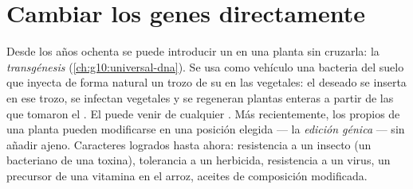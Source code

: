 \section{Cambiar los genes directamente}

\begin{proposition}\label{prop:g12:domesticated-plants:transgenic}
Desde los años ochenta se puede introducir un  en una planta sin
cruzarla: la \emph{transgénesis}
(\cref{ch:g10:universal-dna}). Se usa como vehículo una bacteria del
suelo que inyecta de forma natural un trozo de su  en las 
vegetales: el  deseado se inserta en ese trozo, se infectan 
vegetales y se regeneran plantas enteras a partir de las  que
tomaron el . El  puede venir de cualquier . Más
recientemente, los propios  de una planta pueden modificarse en
una posición elegida --- la \emph{edición génica} --- sin añadir 
ajeno. Caracteres logrados hasta ahora: resistencia a un insecto (un
 bacteriano de una toxina), tolerancia a un herbicida, resistencia a
un virus, un precursor de una vitamina en el arroz, aceites de
composición modificada.
\end{proposition}
\admitted

